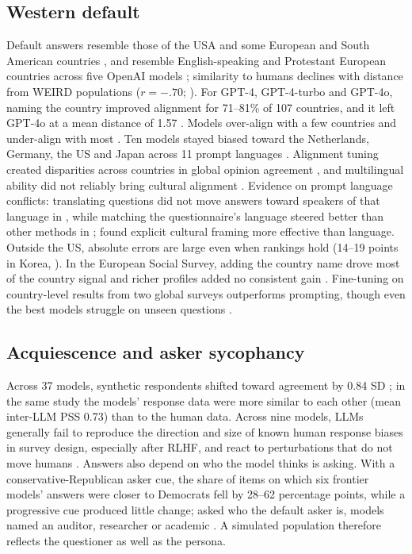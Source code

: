 \documentclass[11pt]{article}
\begin{document}
\subsection{Western default}
Default answers resemble those of the USA and some European and South American countries \citep{durmus2023}, and resemble English-speaking and Protestant European countries across five OpenAI models \citep{tao2024}; similarity to humans declines with distance from WEIRD populations ($r=-.70$; \citealp{atari2023}). For GPT-4, GPT-4-turbo and GPT-4o, naming the country improved alignment for 71--81\% of 107 countries, and it left GPT-4o at a mean distance of 1.57 \citep{tao2024}. Models over-align with a few countries and under-align with most \citep{liu2025global}. Ten models stayed biased toward the Netherlands, Germany, the US and Japan across 11 prompt languages \citep{bulte2026}. Alignment tuning created disparities across countries in global opinion agreement \citep{ryan2024}, and multilingual ability did not reliably bring cultural alignment \citep{rystrom2025}. Evidence on prompt language conflicts: translating questions did not move answers toward speakers of that language in \citet{durmus2023}, while matching the questionnaire's language steered better than other methods in \citet{liu2025global}; \citet{bulte2026} found explicit cultural framing more effective than language. Outside the US, absolute errors are large even when rankings hold (14--19 points in Korea, \citealp{kim2026korean}). In the European Social Survey, adding the country name drove most of the country signal and richer profiles added no consistent gain \citep{wang2026ess}. Fine-tuning on country-level results from two global surveys outperforms prompting, though even the best models struggle on unseen questions \citep{cao2025}.

\subsection{Acquiescence and asker sycophancy}
Across 37 models, synthetic respondents shifted toward agreement by 0.84 SD \citep{lukauskas2026}; in the same study the models' response data were more similar to each other (mean inter-LLM PSS 0.73) than to the human data. Across nine models, LLMs generally fail to reproduce the direction and size of known human response biases in survey design, especially after RLHF, and react to perturbations that do not move humans \citep{tjuatja2024}. Answers also depend on who the model thinks is asking. With a conservative-Republican asker cue, the share of items on which six frontier models' answers were closer to Democrats fell by 28--62 percentage points, while a progressive cue produced little change; asked who the default asker is, models named an auditor, researcher or academic \citep{tornberg2026}. A simulated population therefore reflects the questioner as well as the persona.
\end{document}
